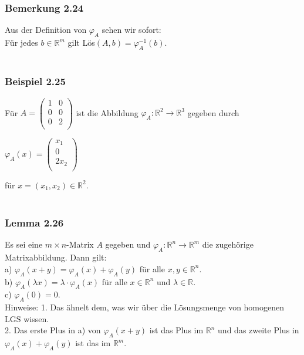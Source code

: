 \documentclass{article}
\begin{document}
\subsubsection*{Bemerkung 2.24}
Aus der Definition von $\varphi_A$ sehen wir sofort: \\
Für jedes $b \in \mathbb{R}^m$ gilt Lös$(A,b) = \varphi_A^{-1}(b)$. \\
\\
\subsubsection*{Beispiel 2.25}
Für $A = \begin{pmatrix}
    1 & 0 \\
    0 & 0 \\
    0 & 2 \\
\end{pmatrix}$ ist die Abbildung $\varphi_A: \mathbb{R}^2 \rightarrow \mathbb{R}^3$ gegeben durch \\
\begin{center}
    $\varphi_A(x) = \begin{pmatrix}
        x_1 \\
        0 \\
        2x_2 \\
    \end{pmatrix}$
\end{center}
für $x=(x_1, x_2) \in \mathbb{R}^2$. \\
\\
\subsubsection*{Lemma 2.26}
Es sei eine $m \times n$-Matrix $A$ gegeben und $\varphi_A: \mathbb{R}^n \rightarrow \mathbb{R}^m$ die zugehörige Matrixabbildung. Dann gilt: \\
a) $\varphi_A(x+y) = \varphi_A(x) + \varphi_A(y)$ für alle $x,y \in \mathbb{R}^n$. \\
b) $\varphi_A(\lambda x) = \lambda \cdot \varphi_A(x)$ für alle $x \in \mathbb{R}^n$ und $\lambda \in \mathbb{R}$. \\
c) $\varphi_A(0) = 0$. \\
Hinweise: 1. Das ähnelt dem, was wir über die Lösungsmenge von homogenen LGS wissen. \\
2. Das erste Plus in a) von $\varphi_A(x+y)$ ist das Plus im $\mathbb{R}^n$ und das zweite Plus in $\varphi_A(x) + \varphi_A(y)$ ist das im $\mathbb{R}^m$. \\
\\
\end{document}
